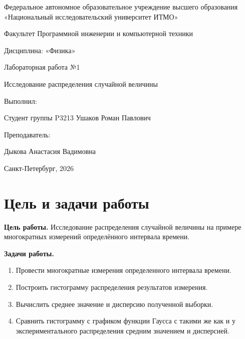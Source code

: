 \documentclass[a4paper,14pt]{extarticle}
\begin{document}
	
	\begin{titlepage}
		\centering
		{\large Федеральное автономное образовательное учреждение высшего образования «Национальный исследовательский университет ИТМО»}
		
		\vspace{1cm}
		
		{\large Факультет Программной инженерии и компьютерной техники}
		
		\vspace{2cm}
		
		{\large Дисциплина: «Физика»}
		
		\vspace{0.5cm}
		
		{\large Лабораторная работа №1}
		
		{\large Исследование распределения случайной величины}
		
		\vfill
		
		\raggedleft
		{\large Выполнил:}
		
		{\large Студент группы P3213 Ушаков Роман Павлович}
		
		\vspace{0.5cm}
		
		{\large Преподаватель:}
		
		{\large Дыкова Анастасия Вадимовна}
		
		\vspace{4.5cm}
		
		\centering
		\large Санкт-Петербург, 2026
	\end{titlepage}
	\setcounter{page}{2}
	
	\tableofcontents
	\newpage
	
	\section{Цель и задачи работы}
	\textbf{Цель работы.} Исследование распределения случайной величины на примере многократных измерений определённого интервала времени.

	\medskip
	\textbf{Задачи работы.}
	\begin{enumerate}
		\item Провести многократные измерения определенного интервала времени.
		\item Построить гистограмму распределения результатов измерения.
		\item Вычислить среднее значение и дисперсию полученной выборки.
		\item Сравнить гистограмму с графиком функции Гаусса с такими же как и у экспериментального распределения средним значением и дисперсией.
	\end{enumerate}
\end{document}
